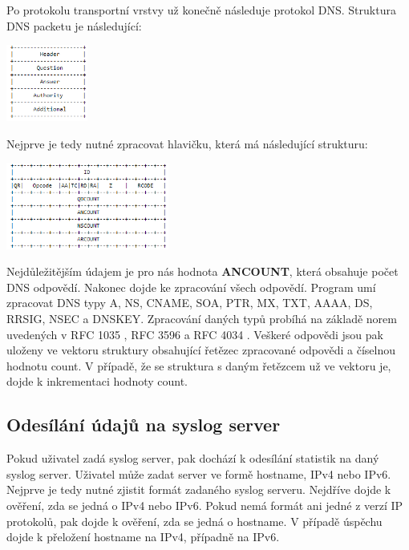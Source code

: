 \documentclass[a4paper, 11pt]{article}
\begin{document}
Po protokolu transportní vrstvy už konečně následuje protokol DNS. Struktura DNS packetu je následující:

\begin{center}
\includegraphics[width=0.2\textwidth]{img/dns-struct.png}
\end{center}

Nejprve je tedy nutné zpracovat hlavičku, která má následující strukturu:

\begin{center}
\includegraphics[width=0.4\textwidth]{img/dns-header-struct.png}
\end{center}

Nejdůležitějším údajem je pro nás hodnota \textbf{ANCOUNT}, která obsahuje počet DNS odpovědí. Nakonec dojde ke zpracování všech odpovědí. Program umí zpracovat DNS typy A, NS, CNAME, SOA, PTR, MX, TXT, AAAA, DS, RRSIG, NSEC a DNSKEY. Zpracování daných typů probíhá na základě norem uvedených v RFC 1035 \cite{RFC1035}, RFC 3596 \cite{RFC3596} a RFC 4034 \cite{RFC4034}. Veškeré odpovědi jsou pak uloženy ve vektoru struktury obsahující řetězec zpracované odpovědi a číselnou hodnotu count. V případě, že se struktura s daným řetězcem už ve vektoru je, dojde k inkrementaci hodnoty count.

\subsection{Odesílání údajů na syslog server}
Pokud uživatel zadá syslog server, pak dochází k odesílání statistik na daný syslog server. Uživatel může zadat server ve formě hostname, IPv4 nebo IPv6. Nejprve je tedy nutné zjistit formát zadaného syslog serveru. Nejdříve dojde k ověření, zda se jedná o IPv4 nebo IPv6. Pokud nemá formát ani jedné z verzí IP protokolů, pak dojde k ověření, zda se jedná o hostname. V případě úspěchu dojde k přeložení hostname na IPv4, případně na IPv6.
\end{document}
